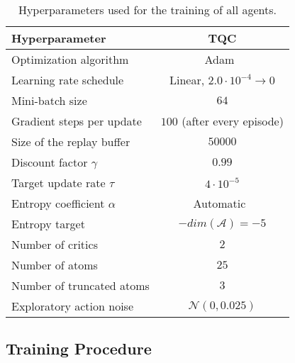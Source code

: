 \begin{table}[ht]
	\centering
	\caption{Hyperparameters used for the training of all agents.}
	\label{tab:hyperaparameters}
	\vspace{-0.25\baselineskip}
	\begin{tabular}{lc}
		\hline
		\textbf{Hyperparameter}        & \textbf{TQC}                                \\ \hline
		Optimization algorithm         & Adam~\cite{kingma_adam_2014}                \\
		Learning rate schedule         & Linear, \(2.0 \cdot 10^{-4} \rightarrow 0\) \\
		Mini-batch size                & \(64\)                                      \\
		Gradient steps per update      & \(100\) (after every episode)               \\
		Size of the replay buffer      & \(50000\)                                   \\
		Discount factor \(\gamma\)     & \(0.99\)                                    \\
		Target update rate \(\tau\)    & \(4 \cdot 10^{-5}\)                         \\
		Entropy coefficient \(\alpha\) & Automatic~\cite{haarnoja_soft_2018}         \\
		Entropy target                 & \(-dim(\mathcal{A})=-5\)                    \\
		Number of critics              & \(2\)                                       \\
		Number of atoms                & \(25\)                                      \\
		Number of truncated atoms      & \(3\)                                       \\
		Exploratory action noise       & \(\mathcal{N}(0, 0.025)\)                   \\  \hline
	\end{tabular}
	\vspace{-0.8\baselineskip}
\end{table}

\subsection{Training Procedure}\label{ssec:training-procedure}

